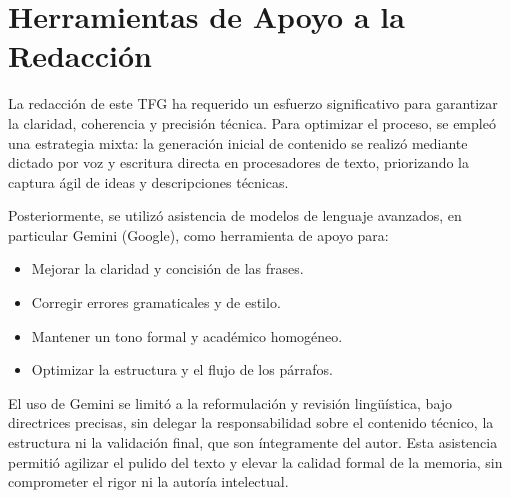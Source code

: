 \section{Herramientas de Apoyo a la Redacción}
\label{sec:apoyo_redaccion}

La redacción de este TFG ha requerido un esfuerzo significativo para garantizar la claridad, coherencia y precisión técnica. Para optimizar el proceso, se empleó una estrategia mixta: la generación inicial de contenido se realizó mediante dictado por voz y escritura directa en procesadores de texto, priorizando la captura ágil de ideas y descripciones técnicas.

Posteriormente, se utilizó asistencia de modelos de lenguaje avanzados, en particular Gemini (Google), como herramienta de apoyo para:
\begin{itemize}
    \item Mejorar la claridad y concisión de las frases.
    \item Corregir errores gramaticales y de estilo.
    \item Mantener un tono formal y académico homogéneo.
    \item Optimizar la estructura y el flujo de los párrafos.
\end{itemize}
El uso de Gemini se limitó a la reformulación y revisión lingüística, bajo directrices precisas, sin delegar la responsabilidad sobre el contenido técnico, la estructura ni la validación final, que son íntegramente del autor. Esta asistencia permitió agilizar el pulido del texto y elevar la calidad formal de la memoria, sin comprometer el rigor ni la autoría intelectual.

